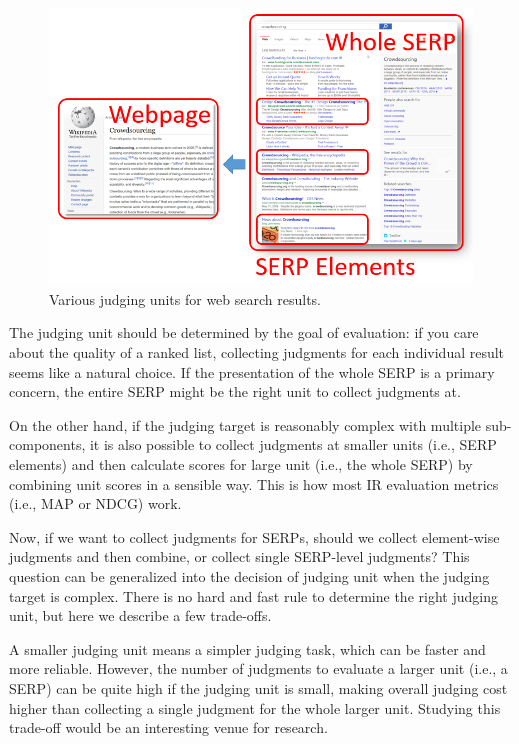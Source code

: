 \begin{figure}
	\begin{center}
		\includegraphics[scale=0.5]{images/judging_units}
		\caption{Various judging units for web search results.} 
		\label{fig:judging_units}
	\end{center}
\end{figure}

The judging unit should be determined by the goal of evaluation: if you care about the quality of a ranked list, collecting judgments for each individual result seems like a natural choice. If the presentation of the whole SERP is a primary concern, the entire SERP might be the right unit to collect judgments at.

On the other hand, if the judging target is reasonably complex with multiple sub-components, it is also possible to collect judgments at smaller units (i.e., SERP elements) and then calculate scores for large unit (i.e., the whole SERP) by combining unit scores in a sensible way. This is how most IR evaluation metrics (i.e., MAP or NDCG) work.

Now, if we want to collect judgments for SERPs, should we collect element-wise judgments and then combine, or collect single SERP-level judgments? This question can be generalized into the decision of judging unit when the judging target is complex. There is no hard and fast rule to determine the right judging unit, but here we describe a few trade-offs. 

A smaller judging unit means a simpler judging task, which can be faster and more reliable. However, the number of judgments to evaluate a larger unit (i.e., a SERP) can be quite high if the judging unit is small, making overall judging cost higher than collecting a single judgment for the whole larger unit. Studying this trade-off would be an interesting venue for research.
 
